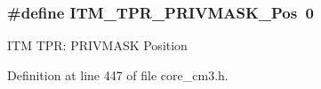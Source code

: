 \subsubsection[{\texorpdfstring{I\+T\+M\+\_\+\+T\+P\+R\+\_\+\+P\+R\+I\+V\+M\+A\+S\+K\+\_\+\+Pos}{ITM_TPR_PRIVMASK_Pos}}]{\setlength{\rightskip}{0pt plus 5cm}\#define I\+T\+M\+\_\+\+T\+P\+R\+\_\+\+P\+R\+I\+V\+M\+A\+S\+K\+\_\+\+Pos~0}\hypertarget{group___c_m_s_i_s___c_m3___i_t_m_ga7abe5e590d1611599df87a1884a352e8}{}\label{group___c_m_s_i_s___c_m3___i_t_m_ga7abe5e590d1611599df87a1884a352e8}
I\+TM T\+PR\+: P\+R\+I\+V\+M\+A\+SK Position 

Definition at line 447 of file core\+\_\+cm3.\+h.

